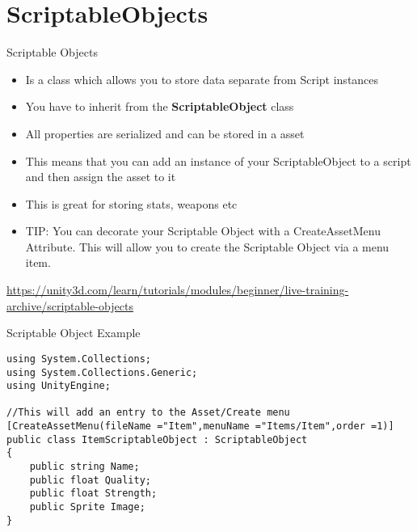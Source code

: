 \part{ScriptableObjects}
\frame{\partpage}

\begin{frame}{Scriptable Objects}
	\begin{itemize}
		\item Is a class which allows you to store data separate from Script instances
		\pause\item You have to inherit from the \textbf{ScriptableObject} class
		\pause\item All properties are serialized and can be stored in a asset
		\pause\item This means that you can add an instance of your ScriptableObject to a script and then assign the asset to it
		\pause\item This is great for storing stats, weapons etc
		\pause\item TIP: You can decorate your Scriptable Object with a CreateAssetMenu Attribute. This will allow you to create the Scriptable Object via a menu item.
	\end{itemize}
	\url{https://unity3d.com/learn/tutorials/modules/beginner/live-training-archive/scriptable-objects}
\end{frame}


\begin{frame}[fragile]{Scriptable Object Example}
\begin{lstlisting}
using System.Collections;
using System.Collections.Generic;
using UnityEngine;

//This will add an entry to the Asset/Create menu
[CreateAssetMenu(fileName ="Item",menuName ="Items/Item",order =1)]
public class ItemScriptableObject : ScriptableObject
{
	public string Name;
	public float Quality;
	public float Strength;
	public Sprite Image;
}
\end{lstlisting} 
\end{frame}